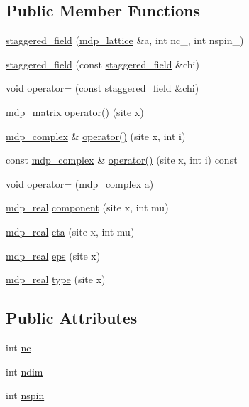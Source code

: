 \subsection*{Public Member Functions}
\begin{DoxyCompactItemize}
\item 
\hyperlink{classstaggered__field_acc7d5a171caf8bda9d0a904c6672432d}{staggered\_\-field} (\hyperlink{classmdp__lattice}{mdp\_\-lattice} \&a, int nc\_\-, int nspin\_)
\item 
\hyperlink{classstaggered__field_a22b5b7f7d050f6356451df02356f181d}{staggered\_\-field} (const \hyperlink{classstaggered__field}{staggered\_\-field} \&chi)
\item 
void \hyperlink{classstaggered__field_a5320371c9d4b87255c578e5b41684e48}{operator=} (const \hyperlink{classstaggered__field}{staggered\_\-field} \&chi)
\item 
\hyperlink{classmdp__matrix}{mdp\_\-matrix} \hyperlink{classstaggered__field_aa881451872889aa0b6c716c01f3fabb7}{operator()} (site x)
\item 
\hyperlink{classmdp__complex}{mdp\_\-complex} \& \hyperlink{classstaggered__field_a32b4553845d0b7f92f99f07e0fbeb64a}{operator()} (site x, int i)
\item 
const \hyperlink{classmdp__complex}{mdp\_\-complex} \& \hyperlink{classstaggered__field_a8cee97da0e262753ab059ef553597a01}{operator()} (site x, int i) const 
\item 
void \hyperlink{classstaggered__field_ac3fee1898eaa4198744c5bc0cc969e2e}{operator=} (\hyperlink{classmdp__complex}{mdp\_\-complex} a)
\item 
\hyperlink{mdp__global__vars_8h_a049e4c1d4e74d644878a42f9909463e4}{mdp\_\-real} \hyperlink{classstaggered__field_a613e227e2cc092c103ce431000fd4b53}{component} (site x, int mu)
\item 
\hyperlink{mdp__global__vars_8h_a049e4c1d4e74d644878a42f9909463e4}{mdp\_\-real} \hyperlink{classstaggered__field_a2f865e7dbd982109e584d26687f5340d}{eta} (site x, int mu)
\item 
\hyperlink{mdp__global__vars_8h_a049e4c1d4e74d644878a42f9909463e4}{mdp\_\-real} \hyperlink{classstaggered__field_ae89b67366b3566c3c8a89d3303dc1d62}{eps} (site x)
\item 
\hyperlink{mdp__global__vars_8h_a049e4c1d4e74d644878a42f9909463e4}{mdp\_\-real} \hyperlink{classstaggered__field_a5e53f3e9e5c268dde3e3f2eb9e64befa}{type} (site x)
\end{DoxyCompactItemize}
\subsection*{Public Attributes}
\begin{DoxyCompactItemize}
\item 
int \hyperlink{classstaggered__field_a4ac408eebebb6b76ac209479df87459a}{nc}
\item 
int \hyperlink{classstaggered__field_a52eed99381c8e8649c6e79ec0fe7a4b8}{ndim}
\item 
int \hyperlink{classstaggered__field_aac06f4fadf069a57cda02bec2ecd8bda}{nspin}
\end{DoxyCompactItemize}



